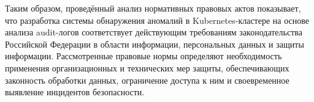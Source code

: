 Таким образом, проведённый анализ нормативных правовых актов показывает, что разработка системы обнаружения аномалий в Kubernetes-кластере на основе анализа audit-логов соответствует действующим требованиям законодательства Российской Федерации в области информации, персональных данных и защиты информации. Рассмотренные правовые нормы определяют необходимость применения организационных и технических мер защиты, обеспечивающих законность обработки данных, ограничение доступа к ним и своевременное выявление инцидентов безопасности.